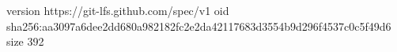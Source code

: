 version https://git-lfs.github.com/spec/v1
oid sha256:aa3097a6dee2dd680a982182fc2e2da42117683d3554b9d296f4537c0c5f49d6
size 392
